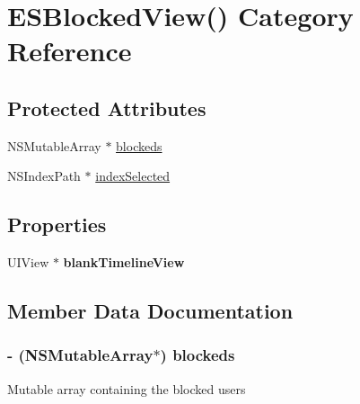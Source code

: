\hypertarget{category_e_s_blocked_view_07_08}{}\section{E\+S\+Blocked\+View() Category Reference}
\label{category_e_s_blocked_view_07_08}
\subsection*{Protected Attributes}
\begin{DoxyCompactItemize}
\item 
N\+S\+Mutable\+Array $\ast$ \hyperlink{category_e_s_blocked_view_07_08_aed27cc6fcfb379ee101bfd4e5a785d98}{blockeds}
\item 
N\+S\+Index\+Path $\ast$ \hyperlink{category_e_s_blocked_view_07_08_ae58145ea6587670264b046d9db1d1e0f}{index\+Selected}
\end{DoxyCompactItemize}
\subsection*{Properties}
\begin{DoxyCompactItemize}
\item 
\hypertarget{category_e_s_blocked_view_07_08_ae53133e34a6e26ec50edfa80faf0f86c}{}U\+I\+View $\ast$ {\bfseries blank\+Timeline\+View}\label{category_e_s_blocked_view_07_08_ae53133e34a6e26ec50edfa80faf0f86c}

\end{DoxyCompactItemize}


\subsection{Member Data Documentation}
\hypertarget{category_e_s_blocked_view_07_08_aed27cc6fcfb379ee101bfd4e5a785d98}{}
\subsubsection[{blockeds}]{\setlength{\rightskip}{0pt plus 5cm}-\/ (N\+S\+Mutable\+Array$\ast$) blockeds\hspace{0.3cm}{\ttfamily [protected]}}\label{category_e_s_blocked_view_07_08_aed27cc6fcfb379ee101bfd4e5a785d98}
Mutable array containing the blocked users \hypertarget{category_e_s_blocked_view_07_08_ae58145ea6587670264b046d9db1d1e0f}{}
